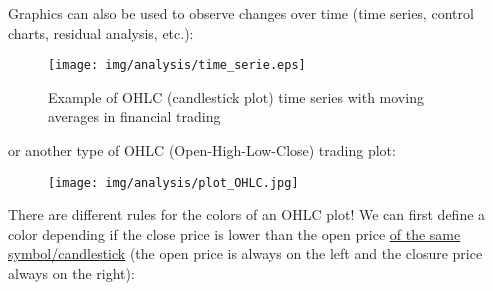 	Graphics can also be used to observe changes over time (time series, control charts, residual analysis, etc.):
	
	\begin{figure}[H]
		\centering
		\texttt{[image: img/analysis/time\_serie.eps]}
		\caption{Example of OHLC (candlestick plot) time series with moving averages in financial trading}
	\end{figure}
	or another type of OHLC (Open-High-Low-Close) trading plot:
	\begin{figure}[H]
		\centering
		\texttt{[image: img/analysis/plot\_OHLC.jpg]}
	\end{figure}
	There are different rules for the colors of an OHLC plot! We can first define a color depending if the close price is lower than the open price \underline{of the same symbol/candlestick} (the open price is always on the left and the closure price always on the right):

